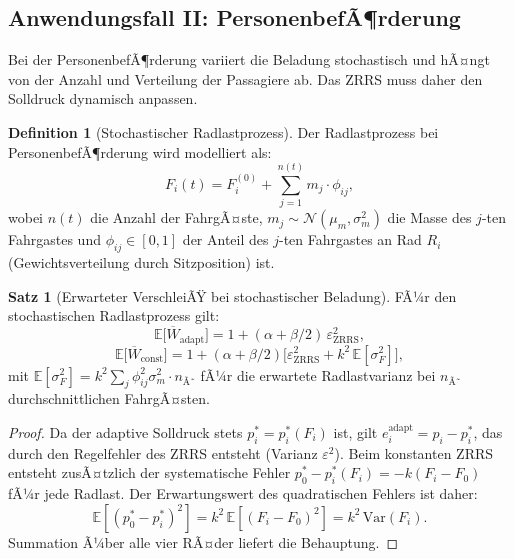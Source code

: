 ﻿\documentclass[a4paper,12pt]{article}
\theoremstyle{definition}
\newtheorem{definition}{Definition}
\newtheorem{satz}{Satz}
\begin{document}
\subsection{Anwendungsfall II: PersonenbefÃ¶rderung}

Bei der PersonenbefÃ¶rderung variiert die Beladung stochastisch und hÃ¤ngt von
der Anzahl und Verteilung der Passagiere ab. Das ZRRS muss daher den Solldruck
dynamisch anpassen.

\begin{definition}[Stochastischer Radlastprozess]
Der Radlastprozess bei PersonenbefÃ¶r\-derung wird modelliert als:
\[
    F_i(t) = F^{(0)}_i + \sum_{j=1}^{n(t)} m_j \cdot \phi_{ij},
\]
wobei $n(t)$ die Anzahl der FahrgÃ¤ste, $m_j \sim \mathcal{N}(\mu_m, \sigma_m^2)$
die Masse des $j$-ten Fahrgastes und $\phi_{ij} \in [0,1]$ der Anteil des
$j$-ten Fahrgastes an Rad $R_i$ (Gewichtsverteilung durch Sitzposition) ist.
\end{definition}

\begin{satz}[Erwarteter VerschleiÃŸ bei stochastischer Beladung]
\label{satz:stoch_person}
FÃ¼r den stochastischen Radlastprozess gilt:
\[
    \mathbb{E}\bigl[\overline{W}_{\text{adapt}}\bigr] = 1
    + (\alpha + \beta/2)\,\varepsilon^2_{\text{ZRRS}},
\]
\[
    \mathbb{E}\bigl[\overline{W}_{\text{const}}\bigr] = 1
    + (\alpha + \beta/2)\bigl[\varepsilon^2_{\text{ZRRS}}
    + k^2\,\mathbb{E}[\sigma^2_F]\bigr],
\]
mit $\mathbb{E}[\sigma^2_F] = k^2 \sum_{j}\phi_{ij}^2 \sigma_m^2 \cdot n_{\text{Ã˜}}$
fÃ¼r die erwartete Radlastvarianz bei $n_{\text{Ã˜}}$ durchschnittlichen FahrgÃ¤sten.
\end{satz}

\begin{proof}
Da der adaptive Solldruck stets $p^*_i = p^*_i(F_i)$ ist, gilt
$e^{\text{adapt}}_i = p_i - p^*_i$, das durch den Regelfehler des ZRRS entsteht
(Varianz $\varepsilon^2$). Beim konstanten ZRRS entsteht zusÃ¤tzlich der
systematische Fehler $p^*_0 - p^*_i(F_i) = -k(F_i - F_0)$ fÃ¼r jede Radlast.
Der Erwartungswert des quadratischen Fehlers ist daher:
\[
    \mathbb{E}[(p^*_0 - p^*_i)^2] = k^2\,\mathbb{E}[(F_i - F_0)^2]
    = k^2\,\text{Var}(F_i).
\]
Summation Ã¼ber alle vier RÃ¤der liefert die Behauptung.
\end{proof}

\end{document}
